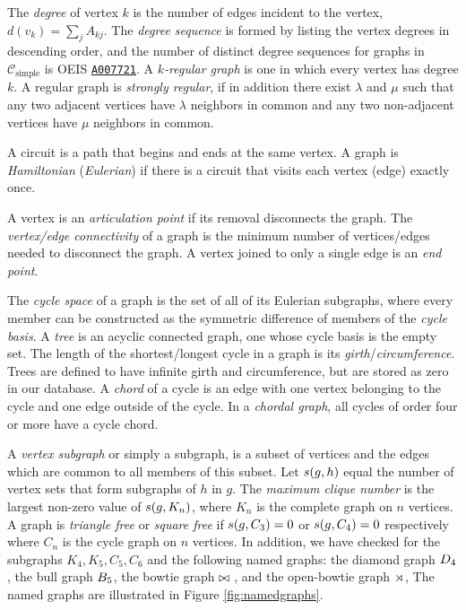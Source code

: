\documentclass[12pt]{article}
\newcommand{\OEIS}[1]
{\href{https://oeis.org/#1}{\texttt{#1}}}
\newcommand{\SIMPLECLASS}{\mathcal{C}_\text{simple}}
\begin{document}
\begin{appendices}
The \textit{degree} of vertex $k$ is the number of edges incident to the vertex, $d(v_k) = \sum_j A_{k j}$. 
The \textit{degree sequence} is formed by listing the vertex degrees in descending order, and the number of distinct degree sequences for graphs in $\SIMPLECLASS$ is OEIS \OEIS{A007721}.
A \textit{$k$-regular graph} is one in which every vertex has degree $k$. 
A regular graph is \textit{strongly regular}, if in addition there exist $\lambda$ and $\mu$ such that any two adjacent vertices have $\lambda$ neighbors in common and any two non-adjacent vertices have $\mu$ neighbors in common. 

A circuit is a path that begins and ends at the same vertex.
A graph is \textit{Hamiltonian} (\textit{Eulerian}) if there is a circuit that visits each vertex (edge) exactly once.

A vertex is an \textit{articulation point} if its removal disconnects the graph. 
The \textit{vertex/edge connectivity} of a graph is the minimum number of vertices/edges needed to disconnect the graph.
A vertex joined to only a single edge is an \textit{end point}.

The \textit{cycle space} of a graph is the set of all of its Eulerian subgraphs, where every member can be constructed as the symmetric difference of members of the \textit{cycle basis}. 
A \textit{tree} is an acyclic connected graph, one whose cycle basis is the empty set.
The length of the shortest/longest cycle in a graph is its \textit{girth}/\textit{circumference}.
Trees are defined to have infinite girth and circumference, but are stored as zero in our database.
A \textit{chord} of a cycle is an edge with one vertex belonging to the cycle and one edge outside of the cycle.
In a \textit{chordal graph}, all cycles of order four or more have a cycle chord.   
 
A \textit{vertex subgraph} or simply a subgraph, is a subset of vertices and the edges which are common to all members of this subset. 
Let $s(g,h)$ equal the number of vertex sets that form subgraphs of $h$ in $g$.
The \textit{maximum clique number} is the largest non-zero value of $s(g, K_n)$, where $K_n$ is the complete graph on $n$ vertices. 
A graph is \textit{triangle free} or \textit{square free} if $s(g,C_3)=0$ or $s(g,C_4)=0$ respectively where $C_n$ is the cycle graph on $n$ vertices.
In addition, we have checked for the subgraphs $K_4, K_5, C_5, C_6$ and the following named graphs: the diamond graph $D_4{}$, the bull graph $B_5{}$, the bowtie graph $\bowtie{}$, and the open-bowtie graph $\rtimes{}$, 
The named graphs are illustrated in Figure \ref{fig:namedgraphs}. 


\end{appendices}
\end{document}
